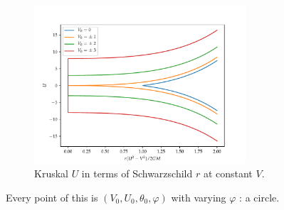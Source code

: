 \documentclass[main.tex]{subfiles}
\begin{document}
\begin{figure}[ht]
  \centering
  \includegraphics[width=0.7\textwidth]{figures/kruskal_constant_V.pdf}
  \caption{Kruskal \(U\) in terms of Schwarzschild \(r\) at constant \(V\).}
  \label{fig:kruskal-constant-V}
\end{figure}

Every point of this is \((V_0, U_0 , \theta_0 ,  \varphi  )\) with varying \(\varphi \) : a circle.  
\end{document}
